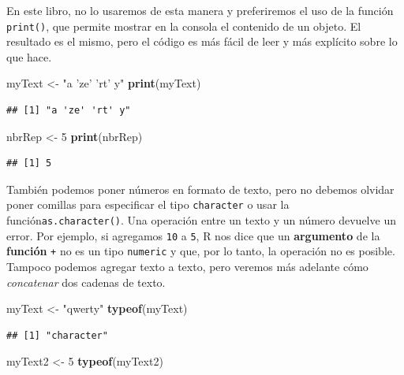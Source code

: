 \documentclass[]{book}
\newenvironment{Shaded}{\begin{snugshade}}{\end{snugshade}}
\newcommand{\KeywordTok}[1]{\textcolor[rgb]{0.13,0.29,0.53}{\textbf{#1}}}
\newcommand{\DecValTok}[1]{\textcolor[rgb]{0.00,0.00,0.81}{#1}}
\newcommand{\StringTok}[1]{\textcolor[rgb]{0.31,0.60,0.02}{#1}}
\newcommand{\NormalTok}[1]{#1}
\begin{document}
En este libro, no lo usaremos de esta manera y preferiremos el uso de la
función \texttt{print()}, que permite mostrar en la consola el contenido
de un objeto. El resultado es el mismo, pero el código es más fácil de
leer y más explícito sobre lo que hace.

\begin{Shaded}
\begin{Highlighting}[]
\NormalTok{myText <-}\StringTok{ "a 'ze' 'rt' y"}
\KeywordTok{print}\NormalTok{(myText)}
\end{Highlighting}
\end{Shaded}

\begin{verbatim}
## [1] "a 'ze' 'rt' y"
\end{verbatim}

\begin{Shaded}
\begin{Highlighting}[]
\NormalTok{nbrRep <-}\StringTok{ }\DecValTok{5}
\KeywordTok{print}\NormalTok{(nbrRep)}
\end{Highlighting}
\end{Shaded}

\begin{verbatim}
## [1] 5
\end{verbatim}

También podemos poner números en formato de texto, pero no debemos
olvidar poner comillas para especificar el tipo \texttt{character} o
usar la función\texttt{as.character()}. Una operación entre un texto y
un número devuelve un error. Por ejemplo, si agregamos \texttt{10} a
\texttt{5}, R nos dice que un \textbf{argumento} de la \textbf{función}
\texttt{+} no es un tipo \texttt{numeric} y que, por lo tanto, la
operación no es posible. Tampoco podemos agregar texto a texto, pero
veremos más adelante cómo \emph{concatenar} dos cadenas de texto.

\begin{Shaded}
\begin{Highlighting}[]
\NormalTok{myText <-}\StringTok{ "qwerty"}
\KeywordTok{typeof}\NormalTok{(myText)}
\end{Highlighting}
\end{Shaded}

\begin{verbatim}
## [1] "character"
\end{verbatim}

\begin{Shaded}
\begin{Highlighting}[]
\NormalTok{myText2 <-}\StringTok{ }\DecValTok{5}
\KeywordTok{typeof}\NormalTok{(myText2)}
\end{Highlighting}
\end{Shaded}
\end{document}
